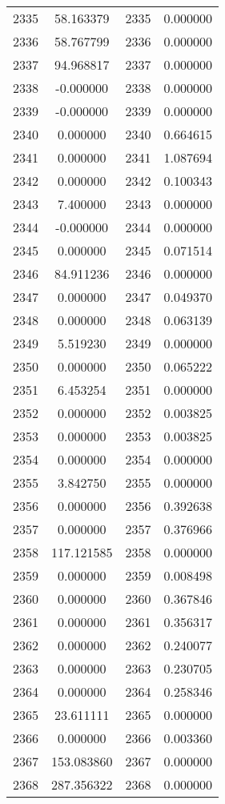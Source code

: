 \documentclass[12pt]{article}
\begin{document}
\begin{longtable}{@{}cccc@{}}
2335 & 58.163379 & 2335 & 0.000000 \\
2336 & 58.767799 & 2336 & 0.000000 \\
2337 & 94.968817 & 2337 & 0.000000 \\
2338 & -0.000000 & 2338 & 0.000000 \\
2339 & -0.000000 & 2339 & 0.000000 \\
2340 & 0.000000 & 2340 & 0.664615 \\
2341 & 0.000000 & 2341 & 1.087694 \\
2342 & 0.000000 & 2342 & 0.100343 \\
2343 & 7.400000 & 2343 & 0.000000 \\
2344 & -0.000000 & 2344 & 0.000000 \\
2345 & 0.000000 & 2345 & 0.071514 \\
2346 & 84.911236 & 2346 & 0.000000 \\
2347 & 0.000000 & 2347 & 0.049370 \\
2348 & 0.000000 & 2348 & 0.063139 \\
2349 & 5.519230 & 2349 & 0.000000 \\
2350 & 0.000000 & 2350 & 0.065222 \\
2351 & 6.453254 & 2351 & 0.000000 \\
2352 & 0.000000 & 2352 & 0.003825 \\
2353 & 0.000000 & 2353 & 0.003825 \\
2354 & 0.000000 & 2354 & 0.000000 \\
2355 & 3.842750 & 2355 & 0.000000 \\
2356 & 0.000000 & 2356 & 0.392638 \\
2357 & 0.000000 & 2357 & 0.376966 \\
2358 & 117.121585 & 2358 & 0.000000 \\
2359 & 0.000000 & 2359 & 0.008498 \\
2360 & 0.000000 & 2360 & 0.367846 \\
2361 & 0.000000 & 2361 & 0.356317 \\
2362 & 0.000000 & 2362 & 0.240077 \\
2363 & 0.000000 & 2363 & 0.230705 \\
2364 & 0.000000 & 2364 & 0.258346 \\
2365 & 23.611111 & 2365 & 0.000000 \\
2366 & 0.000000 & 2366 & 0.003360 \\
2367 & 153.083860 & 2367 & 0.000000 \\
2368 & 287.356322 & 2368 & 0.000000 \\

\end{longtable}
\end{document}
